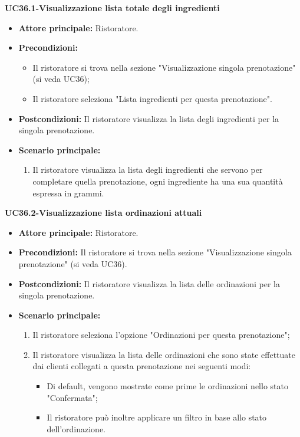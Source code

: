 \textbf{UC36.1-Visualizzazione lista totale degli ingredienti}
\begin{itemize}
    \item \textbf{Attore principale:} Ristoratore.
    \item \textbf{Precondizioni:}
    \begin{itemize}
        \item Il ristoratore si trova nella sezione "Visualizzazione singola prenotazione" (si veda UC36);
        \item Il ristoratore seleziona "Lista ingredienti per questa prenotazione".
    \end{itemize}
    \item \textbf{Postcondizioni:} Il ristoratore visualizza la lista degli ingredienti per la singola prenotazione.
    \item \textbf{Scenario principale:}
    \begin{enumerate}
        \item Il ristoratore visualizza la lista degli ingredienti che servono per completare quella prenotazione, ogni ingrediente ha una sua quantità espressa in grammi.
    \end{enumerate}
\end{itemize}

\textbf{UC36.2-Visualizzazione lista ordinazioni attuali}
\begin{itemize}
    \item \textbf{Attore principale:} Ristoratore.
    \item \textbf{Precondizioni:} Il ristoratore si trova nella sezione "Visualizzazione singola prenotazione" (si veda UC36).
    \item \textbf{Postcondizioni:} Il ristoratore visualizza la lista delle ordinazioni per la singola prenotazione.
    \item \textbf{Scenario principale:}
    \begin{enumerate}
        \item Il ristoratore seleziona l'opzione "Ordinazioni per questa prenotazione";
        \item Il ristoratore visualizza la lista delle ordinazioni che sono state effettuate dai clienti collegati a questa prenotazione nei seguenti modi:
        \begin{itemize}
            \item Di default, vengono mostrate come prime le ordinazioni nello stato "Confermata";
            \item Il ristoratore può inoltre applicare un filtro in base allo stato dell'ordinazione.
        \end{itemize}
    \end{enumerate}
\end{itemize}


